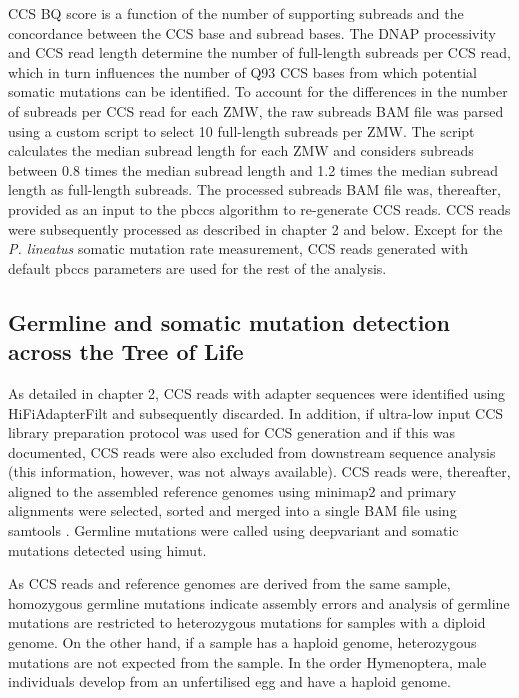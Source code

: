 CCS BQ score is a function of the number of supporting subreads and the concordance between the CCS base and subread bases. The DNAP processivity and CCS read length determine the number of full-length subreads per CCS read, which in turn influences the number of Q93 CCS bases from which potential somatic mutations can be identified. To account for the differences in the number of subreads per CCS read for each ZMW, the raw subreads BAM file was parsed using a custom script to select 10 full-length subreads per ZMW. The script calculates the median subread length for each ZMW and considers subreads between 0.8 times the median subread length and 1.2 times the median subread length as full-length subreads. The processed subreads BAM file was, thereafter, provided as an input to the pbccs algorithm to re-generate CCS reads. CCS reads were subsequently processed as described in chapter 2 and below. Except for the \textit{P. lineatus} somatic mutation rate measurement, CCS reads generated with default pbccs parameters are used for the rest of the analysis. 

\subsection{Germline and somatic mutation detection across the Tree of Life}

As detailed in chapter 2, CCS reads with adapter sequences were identified using HiFiAdapterFilt \cite{} and subsequently discarded. In addition, if ultra-low input CCS library preparation protocol was used for CCS generation and if this was documented, CCS reads were also excluded from downstream sequence analysis (this information, however, was not always available). CCS reads were, thereafter, aligned to the assembled reference genomes using minimap2 \cite{} and primary alignments were selected, sorted and merged into a single BAM file using samtools \cite{}. Germline mutations were called using deepvariant \cite{} and somatic mutations detected using himut. 

As CCS reads and reference genomes are derived from the same sample, homozygous germline mutations indicate assembly errors and analysis of germline mutations are restricted to heterozygous mutations for samples with a diploid genome. On the other hand, if a sample has a haploid genome, heterozygous mutations are not expected from the sample. In the order Hymenoptera, male individuals develop from an unfertilised egg and have a haploid genome. 

